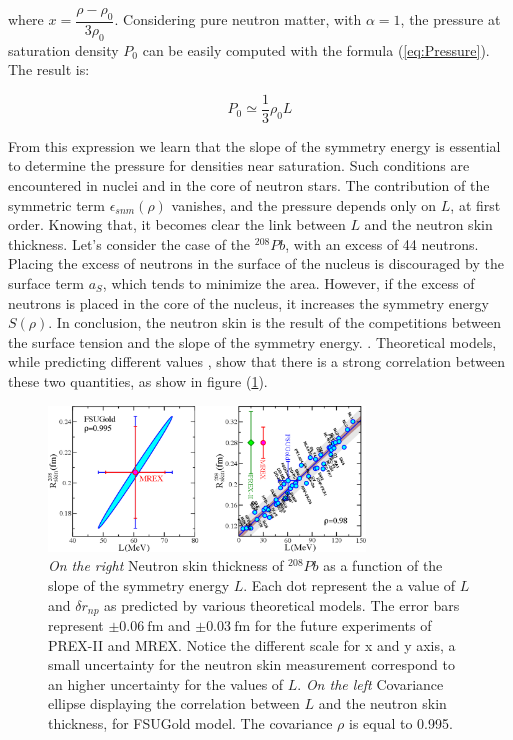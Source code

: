 where $x = \dfrac{\rho - \rho_{0}}{3 \rho_{0}}$. Considering pure neutron matter, with $\alpha = 1$, the pressure at saturation density $P_{0}$ can be easily computed with the formula (\ref{eq:Pressure}). The result is:

\begin{equation} \label{eq:PressureL}
P_{0} \simeq \dfrac{1}{3}\rho_{0} L
\end{equation}

From this expression we learn that the slope of the symmetry energy is essential to determine the pressure for densities near saturation. Such conditions are encountered in nuclei and in the core of neutron stars. The contribution of the symmetric term $\epsilon_{snm}(\rho)$ vanishes, and the pressure depends only on $L$, at first order. Knowing that, it becomes clear the link between $L$ and the neutron skin thickness. Let's consider the case of the $^{208}Pb$, with an excess of 44 neutrons. Placing the excess of neutrons in the surface of the nucleus is discouraged by the surface term $a_{S}$, which tends to minimize the area. However, if the excess of neutrons is placed in the core of the nucleus, it increases the symmetry energy $S(\rho)$. In conclusion, the neutron skin is the result of the competitions between the surface tension and the slope of the symmetry energy.
. Theoretical models, while predicting different values , show that there is a strong correlation between these two quantities, as show in figure (\ref{fig:LvsR}).


\begin{figure}[hbtp]
 \centering
 \includegraphics[width=0.75\textwidth]{Introduzione/LvsR.pdf}
 \caption{\textit{On the right} Neutron skin thickness of $^{208}Pb$ as a function of the slope of the symmetry energy $L$. Each dot represent the a value of $L$ and $\delta r_{np}$ as predicted by various theoretical models. The error bars represent $\pm \SI{0.06}{\femto \meter}$ and $\pm \SI{0.03}{\femto \meter}$ for the future experiments of PREX-II and MREX. Notice the different scale for x and y axis, a small uncertainty for the neutron skin measurement correspond to an higher uncertainty for the values of $L$. \textit{On the left} Covariance ellipse displaying the correlation between $L$ and the neutron skin thickness, for FSUGold model. The covariance $\rho$ is equal to 0.995.}
\label{fig:LvsR}
\end{figure}
 
